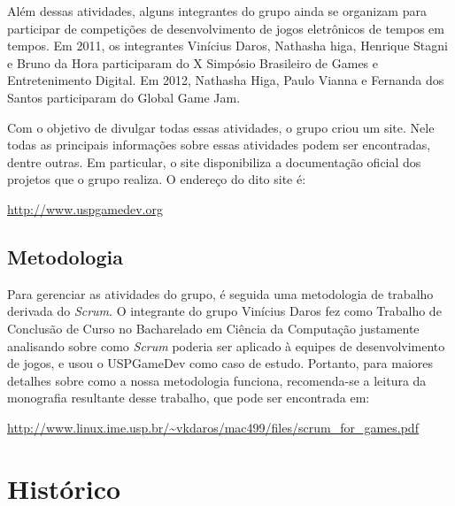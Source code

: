 \documentclass[12pt,onecolumn,a4paper]{article}
\begin{document}
        Além dessas atividades, alguns integrantes do grupo ainda se organizam para participar de
        competições de desenvolvimento de jogos eletrônicos de tempos em tempos. Em 2011, os
        integrantes Vinícius Daros, Nathasha higa, Henrique Stagni e Bruno da Hora participaram do
        X Simpósio Brasileiro de Games e Entretenimento Digital. Em 2012, Nathasha Higa, Paulo
        Vianna e Fernanda dos Santos participaram do Global Game Jam.
        
        Com o objetivo de divulgar todas essas atividades, o grupo criou um site. Nele todas as
        principais informações sobre essas atividades podem ser encontradas, dentre outras. Em
        particular, o site disponibiliza a documentação oficial dos projetos que o grupo realiza. O
        endereço do dito site é:
        
        \begin{center}
            \footnotesize
            \url{http://www.uspgamedev.org}
        \end{center}
    
    \clearpage
    \subsection{Metodologia}
    \label{sec:metodologia}
        Para gerenciar as atividades do grupo, é seguida uma metodologia de trabalho derivada do
        {\it Scrum}. O integrante do grupo Vinícius Daros fez como Trabalho de Conclusão de Curso no
        Bacharelado em Ciência da Computação justamente analisando sobre como {\it Scrum} poderia
        ser aplicado à equipes de desenvolvimento de jogos, e usou o USPGameDev como caso de estudo.
        Portanto, para maiores detalhes sobre como a nossa metodologia funciona, recomenda-se a
        leitura da monografia resultante desse trabalho, que pode ser encontrada em:
        
        \begin{center}
            \footnotesize
            \url{http://www.linux.ime.usp.br/~vkdaros/mac499/files/scrum_for_games.pdf}
        \end{center}

\clearpage
\section{\LARGE Histórico}
    
\end{document}
